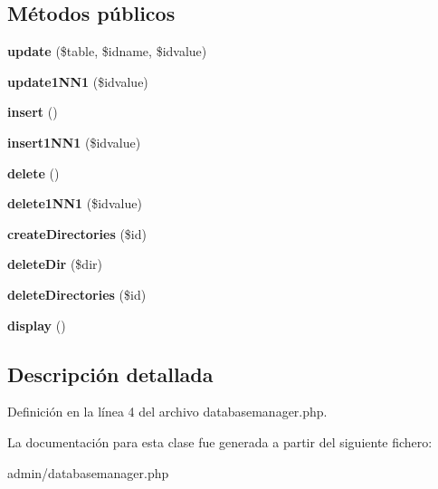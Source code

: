 \subsection*{\-Métodos públicos}
\begin{DoxyCompactItemize}
\item 
\hypertarget{classdatabasemanager_a23e8b4bd50cb6cae2007eb148f5e99ab}{{\bfseries update} (\$table, \$idname, \$idvalue)}\label{classdatabasemanager_a23e8b4bd50cb6cae2007eb148f5e99ab}

\item 
\hypertarget{classdatabasemanager_adb5e50ea96be1714588592eb5024f0b3}{{\bfseries update1\-N\-N1} (\$idvalue)}\label{classdatabasemanager_adb5e50ea96be1714588592eb5024f0b3}

\item 
\hypertarget{classdatabasemanager_ac215ce5b47d2f5bfa36621fe45b3eedf}{{\bfseries insert} ()}\label{classdatabasemanager_ac215ce5b47d2f5bfa36621fe45b3eedf}

\item 
\hypertarget{classdatabasemanager_a09e06d8512461851688d5a34d5a31c1d}{{\bfseries insert1\-N\-N1} (\$idvalue)}\label{classdatabasemanager_a09e06d8512461851688d5a34d5a31c1d}

\item 
\hypertarget{classdatabasemanager_a86356dce647d0d5c74ff78276844f8ca}{{\bfseries delete} ()}\label{classdatabasemanager_a86356dce647d0d5c74ff78276844f8ca}

\item 
\hypertarget{classdatabasemanager_ac40bb924bbe6dff5aba9f0c1636a2fdd}{{\bfseries delete1\-N\-N1} (\$idvalue)}\label{classdatabasemanager_ac40bb924bbe6dff5aba9f0c1636a2fdd}

\item 
\hypertarget{classdatabasemanager_ad3462cf95718f57f3c7cc634c9d3a829}{{\bfseries create\-Directories} (\$id)}\label{classdatabasemanager_ad3462cf95718f57f3c7cc634c9d3a829}

\item 
\hypertarget{classdatabasemanager_a183c2e82b2a4d6429fea64565a723a47}{{\bfseries delete\-Dir} (\$dir)}\label{classdatabasemanager_a183c2e82b2a4d6429fea64565a723a47}

\item 
\hypertarget{classdatabasemanager_a4f77b12a19b44a980cf33c833ce27b21}{{\bfseries delete\-Directories} (\$id)}\label{classdatabasemanager_a4f77b12a19b44a980cf33c833ce27b21}

\item 
\hypertarget{classdatabasemanager_a321eb1187e03a72d03509388b3daddec}{{\bfseries display} ()}\label{classdatabasemanager_a321eb1187e03a72d03509388b3daddec}

\end{DoxyCompactItemize}


\subsection{\-Descripción detallada}


\-Definición en la línea 4 del archivo databasemanager.\-php.



\-La documentación para esta clase fue generada a partir del siguiente fichero\-:\begin{DoxyCompactItemize}
\item 
admin/databasemanager.\-php\end{DoxyCompactItemize}
